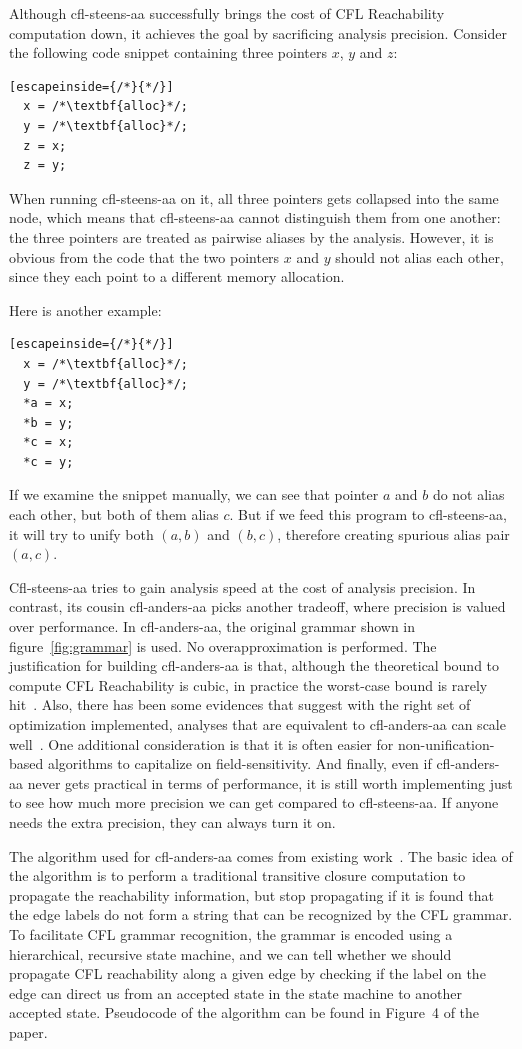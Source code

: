 \documentclass[10pt]{article}
\begin{document}
Although cfl-steens-aa successfully brings the cost of CFL Reachability
computation down, it achieves the goal by sacrificing analysis precision.
Consider the following code snippet containing three pointers $x$, $y$ and $z$:
\begin{lstlisting}[escapeinside={/*}{*/}]
  x = /*\textbf{alloc}*/;
  y = /*\textbf{alloc}*/;
  z = x;
  z = y;
\end{lstlisting}

When running cfl-steens-aa on it, all three pointers gets collapsed into the
same node, which means that cfl-steens-aa cannot distinguish them from one
another: the three pointers are treated as pairwise aliases by the
analysis. However, it is obvious from the code that the two pointers $x$ and $y$ should not
alias each other, since they each point to a different memory allocation.

Here is another example:
\begin{lstlisting}[escapeinside={/*}{*/}]
  x = /*\textbf{alloc}*/;
  y = /*\textbf{alloc}*/;
  *a = x;
  *b = y;
  *c = x;
  *c = y;
\end{lstlisting}
If we examine the snippet manually, we can see that pointer $a$ and $b$ do not
alias each other, but both of them alias $c$. But if we feed this program to
cfl-steens-aa, it will try to unify both $(a, b)$ and $(b, c)$, therefore
creating spurious alias pair $(a, c)$. 

Cfl-steens-aa tries to gain analysis speed at the cost of analysis precision. In
contrast, its cousin cfl-anders-aa picks another tradeoff, where precision is valued
over performance. In cfl-anders-aa, the original grammar shown in
figure~\ref{fig:grammar} is used. No overapproximation is performed. The
justification for building cfl-anders-aa is that, although the
theoretical bound to compute CFL Reachability is cubic, in practice the worst-case bound is rarely
hit~\cite{Sridharan:2009}. Also, there has been some evidences that suggest
with the right set of optimization implemented, analyses that are equivalent
to cfl-anders-aa can scale well~\cite{Hardekopf:2007}\cite{Hardekopf:2007_2}.
One additional consideration is that it is often easier for non-unification-based
algorithms to capitalize on field-sensitivity. And finally, even if
cfl-anders-aa never gets practical in terms of performance, it is still worth
implementing just to see how much more precision we can get compared to
cfl-steens-aa. If anyone needs the extra precision, they can always turn it on. 

The algorithm used for cfl-anders-aa comes from existing work~\cite{Zheng:2008}.
The basic idea of the algorithm is to perform a traditional transitive closure
computation to propagate the reachability information, but stop propagating if
it is found that the edge labels do not form a string that can be recognized by
the CFL grammar. To facilitate CFL grammar recognition, the grammar is encoded
using a hierarchical, recursive state machine, and we can tell whether we should
propagate CFL reachability along a given edge by checking if the label on the
edge can direct us from an accepted state in the state
machine to another accepted state. Pseudocode of the algorithm can be found in
Figure~4 of the paper.
\end{document}
